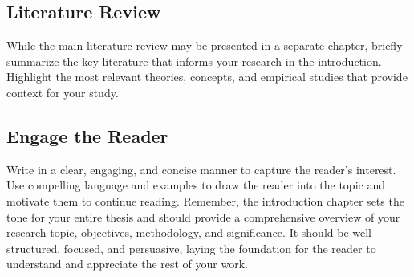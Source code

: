 \subsection{Literature Review}
While the main literature review may be presented in a separate chapter, briefly summarize the key literature that informs your research in the introduction.
Highlight the most relevant theories, concepts, and empirical studies that provide context for your study.

\subsection{Engage the Reader}
Write in a clear, engaging, and concise manner to capture the reader's interest.
Use compelling language and examples to draw the reader into the topic and motivate them to continue reading.
Remember, the introduction chapter sets the tone for your entire thesis and should provide a comprehensive overview of your research topic, objectives, methodology, and significance.
It should be well-structured, focused, and persuasive, laying the foundation for the reader to understand and appreciate the rest of your work.

